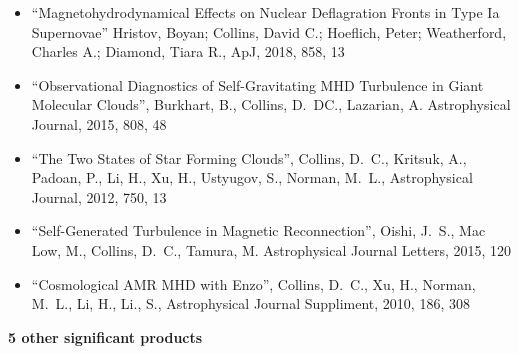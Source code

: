 \documentclass[11pt]{article}
\begin{document}
\begin{itemize}

\item
``Magnetohydrodynamical Effects on Nuclear Deflagration Fronts in Type Ia Supernovae''
Hristov, Boyan; Collins, David C.; Hoeflich, Peter; Weatherford, Charles A.; Diamond, Tiara R., 
ApJ, 2018, 858, 13

\item ``Observational Diagnostics of Self-Gravitating MHD Turbulence in Giant
Molecular Clouds'', {Burkhart}, B., {Collins}, D.~DC., {Lazarian}, A.
Astrophysical Journal, 2015, 808, 48



\item 
``The Two States of Star Forming Clouds'', 
Collins, D.~C., Kritsuk, A., Padoan, P., Li, H., Xu, H., Ustyugov, S., Norman, M.~L.,
Astrophysical Journal, 2012, 750, 13

\item ``Self-Generated Turbulence in Magnetic Reconnection'', {Oishi}, J.~S.,
{Mac
Low}, M., {Collins}, D.~C., Tamura, M.  Astrophysical Journal Letters,
2015, 120


\item ``Cosmological AMR MHD with Enzo'', 
Collins, D.~C., Xu, H., Norman, M.~L., Li, H., Li., S.,
Astrophysical Journal Suppliment, 2010, 186, 308


\end{itemize}

\vspace{-2mm}
\noindent
\textbf{5 other significant products}
\vspace{-4mm}
\end{document}
